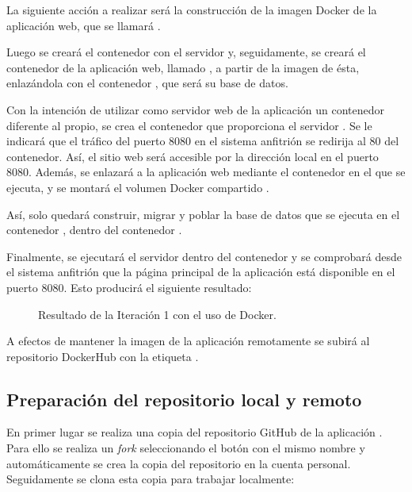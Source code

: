 La siguiente acción a realizar será la construcción de la imagen Docker de la aplicación web, que se llamará . 

Luego se creará el contenedor  con el servidor  y, seguidamente, se creará el contenedor de la aplicación web, llamado , a partir de la imagen de ésta, enlazándola con el contenedor , que será su base de datos.

Con la intención de utilizar como servidor web de la aplicación un contenedor diferente al propio, se crea el contenedor  que proporciona el servidor . Se le indicará que el tráfico del puerto 8080 en el sistema anfitrión se redirija al 80 del contenedor. Así, el sitio web será accesible por la dirección local en el puerto 8080. Además, se enlazará a la aplicación web mediante el contenedor en el que se ejecuta, y se montará el volumen Docker compartido .

Así, solo quedará construir, migrar y poblar la base de datos que se ejecuta en el contenedor , dentro del contenedor .

Finalmente, se ejecutará el servidor  dentro del contenedor  y se comprobará desde el sistema anfitrión que la página principal de la aplicación  está disponible en el puerto 8080. Esto producirá el siguiente resultado:

\begin{figure}[H]
\caption{Resultado de la Iteración 1 con el uso de Docker.\label{fig:figure_placement_example}}
\end{figure}

A efectos de mantener la imagen de la aplicación remotamente se subirá al repositorio DockerHub con la etiqueta .

\subsection{Preparación del repositorio local y remoto}

En primer lugar se realiza una copia del repositorio GitHub de la aplicación . Para ello se realiza un \textit{fork} seleccionando el botón con el mismo nombre y automáticamente se crea la copia del repositorio en la cuenta personal. Seguidamente se clona esta copia para trabajar localmente:

